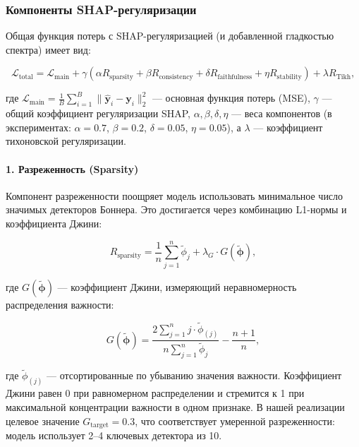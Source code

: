 \subsubsection{Компоненты SHAP-регуляризации}

Общая функция потерь с SHAP-регуляризацией (и добавленной гладкостью спектра) имеет вид:

\begin{equation}
\mathcal{L}_{\text{total}} = \mathcal{L}_{\text{main}} + \gamma \left( \alpha R_{\text{sparsity}} + \beta R_{\text{consistency}} + \delta R_{\text{faithfulness}} + \eta R_{\text{stability}} \right) + \lambda R_{\text{Tikh}},
\end{equation}

где $\mathcal{L}_{\text{main}} = \frac{1}{B} \sum_{i=1}^{B} \|\hat{\mathbf{y}}_i - \mathbf{y}_i\|_2^2$ --- основная функция потерь (MSE), $\gamma$ --- общий коэффициент регуляризации SHAP, $\alpha, \beta, \delta, \eta$ --- веса компонентов (в экспериментах: $\alpha=0.7$, $\beta=0.2$, $\delta=0.05$, $\eta=0.05$), а $\lambda$ --- коэффициент тихоновской регуляризации.

\paragraph{1. Разреженность (Sparsity)}

Компонент разреженности поощряет модель использовать минимальное число значимых детекторов Боннера. Это достигается через комбинацию L1-нормы и коэффициента Джини:

\begin{equation}
R_{\text{sparsity}} = \frac{1}{n} \sum_{j=1}^{n} \tilde{\phi}_j + \lambda_G \cdot G(\tilde{\boldsymbol{\phi}}),
\end{equation}

где $G(\tilde{\boldsymbol{\phi}})$ --- коэффициент Джини, измеряющий неравномерность распределения важности:

\begin{equation}
G(\tilde{\boldsymbol{\phi}}) = \frac{2 \sum_{j=1}^{n} j \cdot \tilde{\phi}_{(j)}}{n \sum_{j=1}^{n} \tilde{\phi}_j} - \frac{n+1}{n},
\end{equation}

где $\tilde{\phi}_{(j)}$ --- отсортированные по убыванию значения важности. Коэффициент Джини равен 0 при равномерном распределении и стремится к 1 при максимальной концентрации важности в одном признаке. В нашей реализации целевое значение $G_{\text{target}} = 0.3$, что соответствует умеренной разреженности: модель использует 2--4 ключевых детектора из 10.

